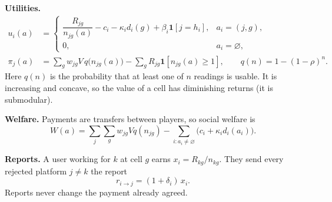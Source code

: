 \documentclass[12pt,draftcls,onecolumn]{IEEEtran}
\begin{document}
\textbf{Utilities.}
\begin{align}
u_i(a)&=\begin{cases}\dfrac{R_{jg}}{n_{jg}(a)}-c_i-\kappa_i d_i(g)+\beta_i\mathbf 1[j=h_i], & a_i=(j,g),\\[4pt] 0, & a_i=\varnothing,\end{cases}\label{eq:user}\\
\pi_j(a)&=\sum_g w_{jg}V\,q\big(n_{jg}(a)\big)-\sum_g R_{jg}\mathbf 1[n_{jg}(a)\ge1],\qquad q(n)=1-(1-\rho)^n.\label{eq:platform}
\end{align}
Here $q(n)$ is the probability that at least one of $n$ readings is usable. It is increasing and concave, so the value of a cell has diminishing returns (it is submodular).

\textbf{Welfare.} Payments are transfers between players, so social welfare is
\[W(a)=\sum_j\sum_g w_{jg}Vq(n_{jg})-\sum_{i:a_i\ne\varnothing}\big(c_i+\kappa_id_i(a_i)\big).\]

\textbf{Reports.} A user working for $k$ at cell $g$ earns $x_i=R_{kg}/n_{kg}$. They send every rejected platform $j\neq k$ the report
\[r_{i\to j}=(1+\delta_i)\,x_i.\]
Reports never change the payment already agreed.
\end{document}
